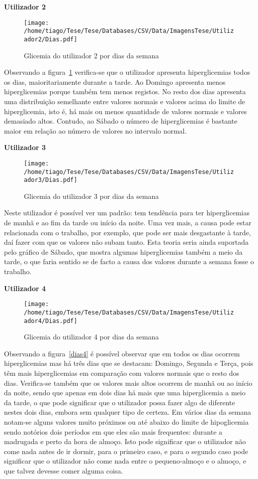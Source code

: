 \textbf{Utilizador 2}


\begin{figure}[H]
\centering
\texttt{[image: /home/tiago/Tese/Tese/Databases/CSV/Data/ImagensTese/Utilizador2/Dias.pdf]}
\caption{Glicemia do utilizador 2 por dias da semana}
\label{fig:dias2}
\end{figure}
Observando a figura~\ref{fig:dias2} verifica-se que o utilizador apresenta hiperglicemias todos os dias, maioritariamente durante a tarde. Ao Domingo apresenta menos hiperglicemias porque também tem menos registos. No resto dos dias apresenta uma distribuição semelhante entre valores normais e valores acima do limite de hiperglicemia, isto é, há mais ou menos quantidade de valores normais e valores demasiado altos. Contudo, ao Sábado o número de hiperglicemias é bastante maior em relação ao número de valores no intervalo normal.\newpage



\textbf{Utilizador 3}

\begin{figure}[H]
\centering
\texttt{[image: /home/tiago/Tese/Tese/Databases/CSV/Data/ImagensTese/Utilizador3/Dias.pdf]}
\caption{Glicemia do utilizador 3 por dias da semana}
\label{fig:dias3}
\end{figure}
Neste utilizador é possível ver um padrão: tem tendência para ter hiperglicemias de manhã e ao fim da tarde ou início da noite. Uma vez mais, a causa pode estar relacionada com o trabalho, por exemplo, que pode ser mais desgastante à tarde, daí fazer com que os valores não subam tanto. Esta teoria seria ainda suportada pelo gráfico de Sábado, que mostra algumas hiperglicemias também a meio da tarde, o que faria sentido se de facto a causa dos valores durante a semana fosse o trabalho.\newpage

\textbf{Utilizador 4}

\begin{figure}[H]
\centering
\texttt{[image: /home/tiago/Tese/Tese/Databases/CSV/Data/ImagensTese/Utilizador4/Dias.pdf]}
\caption{Glicemia do utilizador 4 por dias da semana}
\label{fig:dias4}
\end{figure}
Observando a figura~\ref{dias4} é possível observar que em todos os dias ocorrem hiperglicemias mas há três dias que se destacam: Domingo, Segunda e Terça, pois têm mais hiperglicemias em comparação com valores normais que o resto dos dias. Verifica-se também que os valores mais altos ocorrem de manhã ou ao início da noite, sendo que apenas em dois dias há mais que uma hiperglicemia a meio da tarde, o que pode significar que o utilizador possa fazer algo de diferente nestes dois dias, embora sem qualquer tipo de certeza. 
Em vários dias da semana notam-se alguns valores muito próximos ou até abaixo do limite de hipoglicemia sendo notórios dois períodos em que eles são mais frequentes: durante a madrugada e perto da hora de almoço. Isto pode significar que o utilizador não come nada antes de ir dormir, para o primeiro caso, e para o segundo caso pode significar que o utilizador não come nada entre o pequeno-almoço e o almoço, e que talvez devesse comer alguma coisa.\newpage


